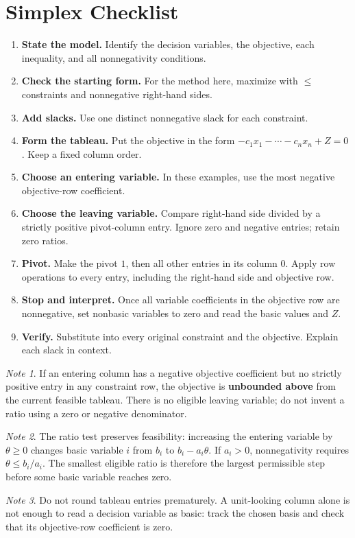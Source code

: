 \documentclass{article}
\theoremstyle{plain}
\theoremstyle{definition}
\theoremstyle{remark}
\newtheorem*{note}{Note}
\begin{document}
\section*{Simplex Checklist}
\begin{enumerate}
\item \textbf{State the model.} Identify the decision variables, the objective, each inequality, and all nonnegativity conditions.
\item \textbf{Check the starting form.} For the method here, maximize with $\le$ constraints and nonnegative right-hand sides.
\item \textbf{Add slacks.} Use one distinct nonnegative slack for each constraint.
\item \textbf{Form the tableau.} Put the objective in the form $-c_1x_1-\cdots-c_nx_n+Z=0$. Keep a fixed column order.
\item \textbf{Choose an entering variable.} In these examples, use the most negative objective-row coefficient.
\item \textbf{Choose the leaving variable.} Compare right-hand side divided by a strictly positive pivot-column entry. Ignore zero and negative entries; retain zero ratios.
\item \textbf{Pivot.} Make the pivot $1$, then all other entries in its column $0$. Apply row operations to every entry, including the right-hand side and objective row.
\item \textbf{Stop and interpret.} Once all variable coefficients in the objective row are nonnegative, set nonbasic variables to zero and read the basic values and $Z$.
\item \textbf{Verify.} Substitute into every original constraint and the objective. Explain each slack in context.
\end{enumerate}
\begin{note}
If an entering column has a negative objective coefficient but no strictly positive entry in any constraint row, the objective is \textbf{unbounded above} from the current feasible tableau. There is no eligible leaving variable; do not invent a ratio using a zero or negative denominator.
\end{note}
\begin{note}
The ratio test preserves feasibility: increasing the entering variable by $\theta\ge0$ changes basic variable $i$ from $b_i$ to $b_i-a_i\theta$. If $a_i>0$, nonnegativity requires $\theta\le b_i/a_i$. The smallest eligible ratio is therefore the largest permissible step before some basic variable reaches zero.
\end{note}
\begin{note}
Do not round tableau entries prematurely. A unit-looking column alone is not enough to read a decision variable as basic: track the chosen basis and check that its objective-row coefficient is zero.
\end{note}
\vfill
\end{document}
